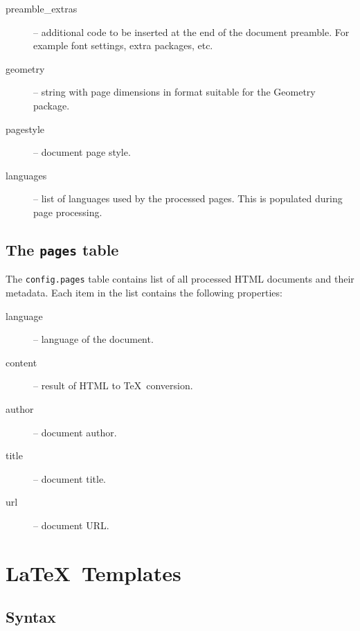 \documentclass{article}
\begin{document}
\begin{description}

  \item[preamble\_extras] -- additional code to be inserted at the end of the
    document preamble. For example font settings, extra packages, etc.
  \item[geometry] -- string with page dimensions in format suitable for the Geometry package. 
  \item[pagestyle] -- document page style.
  \item[languages] -- list of languages used by the processed pages. This is populated during page processing.


\end{description}

\subsection{The \texttt{pages} table}

The \texttt{config.pages} table contains list of all processed HTML documents and their metadata.
Each item in the list contains the following properties:

\begin{description}
  \item[language] -- language of the document.
  \item[content] -- result of HTML to \TeX\ conversion.
  \item[author] -- document author.
  \item[title] -- document title.
  \item[url] -- document URL.
\end{description}


\section{\LaTeX\ Templates}


\subsection{Syntax}
\end{document}
